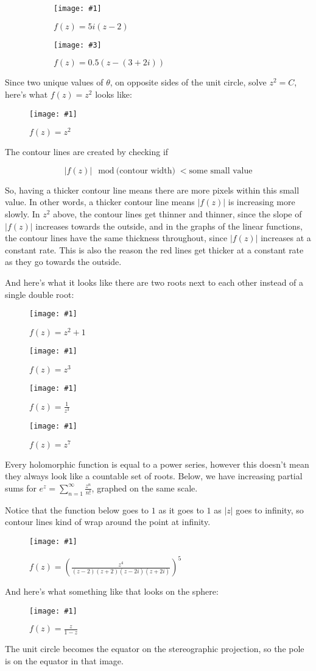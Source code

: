 \documentclass[xhtml, mathjax]{article}
\newcommand{\singleimage}[2] {
  \begin{figure}
    \centering
    \texttt{[image: \#1]}\par
    #2
  \end{figure}
}
\newcommand{\doubleimage}[4] {
  \begin{figure}
    \centering
    \begin{subfigure}{0.5\linewidth}
      \centering
      \texttt{[image: \#1]}\par
      #2
    \end{subfigure}
    \begin{subfigure}{0.5\linewidth}
      \centering
      \texttt{[image: \#3]}\par
      #4
    \end{subfigure}
  \end{figure}
}
\begin{document}
    \doubleimage{linear_1.gif}{$f(z)=5i(z-2)$}{linear_2.gif}{$f(z)=0.5(z-(3+2i))$}

    Since two unique values of $\theta$, on opposite sides of the unit circle,
    solve $z^2 = C$, here's what $f(z) = z^2$ looks like:

    \singleimage{poly_1.gif}{$f(z)=z^2$}

    The contour lines are created by checking if

    \[|f(z)| \mod \text{(contour width)} < \text{some small value}\]

    So, having a thicker contour line means there
    are more pixels within this small value. In other words, a thicker contour
    line means $|f(z)|$ is increasing more slowly. In $z^2$ above, the contour
    lines get thinner and thinner, since the slope of $|f(z)|$ increases towards
    the outside, and in the graphs of the linear functions, the contour lines
    have the same thickness throughout, since $|f(z)|$ increases at a constant
    rate. This is also the reason the red lines get thicker at a constant rate
    as they go towards the outside.

    And here's what it looks like there are two roots next to each other instead
    of a single double root:

    \singleimage{poly_2.gif}{$f(z)=z^2+1$}

    \singleimage{poly_3.gif}{$f(z)=z^3$}

    \singleimage{poly_7.gif}{$f(z)=\frac{1}{z^3}$}

    \singleimage{poly_4.gif}{$f(z)=z^7$}

    Every holomorphic function is equal to a power series, however this doesn't
    mean they always look like a countable set of roots. Below, we have
    increasing partial sums for $e^z = \sum_{n=1}^\infty \frac{z^n}{n!}$,
    graphed on the same scale.

    Notice that the function below goes to $1$ as it goes to $1$ as $|z|$ goes
    to infinity, so contour lines kind of wrap around the point at infinity.

    \singleimage{poly_5.gif}{$f(z)=\left(\frac{z^4}{(z-2)(z+2)(z-2i)(z+2i)}\right)^5$}

    And here's what something like that looks on the sphere:

    \singleimage{sphere_poly_2.gif}{$f(z)=\frac{z}{1-z}$}

    The unit circle becomes the equator on the stereographic projection, so the
    pole is on the equator in that image.
\end{document}
